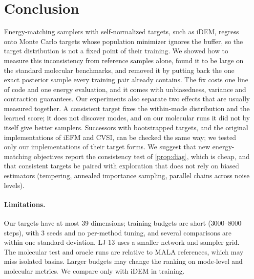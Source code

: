 \section{Conclusion}
\label{sec:conclusion}
Energy-matching samplers with self-normalized targets, such as iDEM, regress onto Monte Carlo targets whose population minimizer ignores the buffer, so the target distribution is not a fixed point of their training. We showed how to measure this inconsistency from reference samples alone, found it to be large on the standard molecular benchmarks, and removed it by putting back the one exact posterior sample every training pair already contains. The fix costs one line of code and one energy evaluation, and it comes with unbiasedness, variance and contraction guarantees.
Our experiments also separate two effects that are usually measured together. A consistent target fixes the within-mode distribution and the learned score; it does not discover modes, and on our molecular runs it did not by itself give better samplers. Successors with bootstrapped targets, and the original implementations of iEFM and CVSI, can be checked the same way; we tested only our implementations of their target forms. We suggest that new energy-matching objectives report the consistency test of \cref{prop:diag}, which is cheap, and that consistent targets be paired with exploration that does not rely on biased estimators (tempering, annealed importance sampling, parallel chains across noise levels).
\paragraph{Limitations.}
Our targets have at most 39 dimensions; training budgets are short ($3000$--$8000$ steps), with 3 seeds and no per-method tuning, and several comparisons are within one standard deviation. LJ-13 uses a smaller network and sampler grid. The molecular test and oracle runs are relative to MALA references, which may miss isolated basins. Larger budgets may change the ranking on mode-level and molecular metrics. We compare only with iDEM in training.
